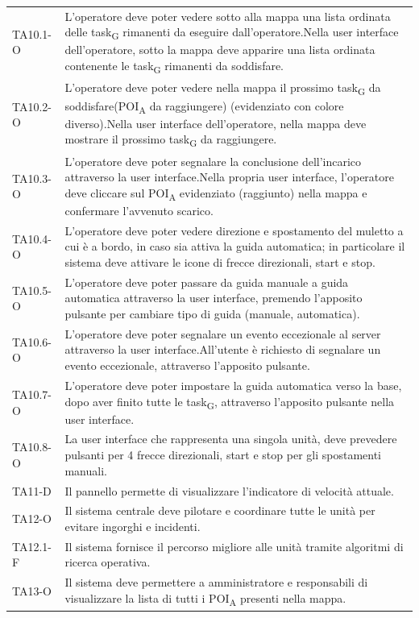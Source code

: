 \begin{longtable}{ >{\centering}p{} >{}p{}}
	TA10.1-O & L'operatore deve poter vedere sotto alla mappa una lista ordinata delle task\textsubscript{G} rimanenti da eseguire dall'operatore.\newline Nella user interface dell'operatore, sotto la mappa deve apparire una lista ordinata contenente le task\textsubscript{G} rimanenti da soddisfare.\tabularnewline
	TA10.2-O & L'operatore deve poter vedere nella mappa il prossimo task\textsubscript{G} da soddisfare(POI\textsubscript{A} da raggiungere) (evidenziato con colore diverso).\newline Nella user interface dell'operatore, nella mappa deve mostrare il prossimo task\textsubscript{G} da raggiungere.\tabularnewline
	TA10.3-O & L'operatore deve poter segnalare la conclusione dell'incarico attraverso la user interface.\newline Nella propria user interface, l'operatore deve cliccare sul POI\textsubscript{A} evidenziato (raggiunto) nella mappa e confermare l'avvenuto scarico.\tabularnewline
	TA10.4-O & L'operatore deve poter vedere direzione e spostamento del muletto a cui è a bordo, in caso sia attiva la guida automatica; in particolare il sistema deve attivare le icone di frecce direzionali, start e stop. \tabularnewline
	TA10.5-O & L'operatore deve poter passare da guida manuale a guida automatica attraverso la user interface, premendo l'apposito pulsante per cambiare tipo di guida (manuale, automatica).\tabularnewline
	TA10.6-O & L'operatore deve poter segnalare un evento eccezionale al server attraverso la user interface.\newline All'utente è richiesto di segnalare un evento eccezionale, attraverso l'apposito pulsante.\tabularnewline
	TA10.7-O & L'operatore deve poter impostare la guida automatica verso la base, dopo aver finito tutte le task\textsubscript{G}, attraverso l'apposito pulsante nella user interface.\tabularnewline
	TA10.8-O & La user interface che rappresenta una singola unità, deve prevedere pulsanti per 4 frecce direzionali, start e stop per gli spostamenti manuali.\tabularnewline

	TA11-D & Il pannello permette di visualizzare l'indicatore di velocità attuale.\tabularnewline

	TA12-O & Il sistema centrale deve pilotare e coordinare tutte le unità per evitare ingorghi e incidenti.\tabularnewline
	TA12.1-F & Il sistema fornisce il percorso migliore alle unità tramite algoritmi di ricerca operativa.\tabularnewline

	TA13-O & Il sistema deve permettere a amministratore e responsabili di visualizzare la lista di tutti i POI\textsubscript{A} presenti nella mappa.\tabularnewline


\end{longtable}
